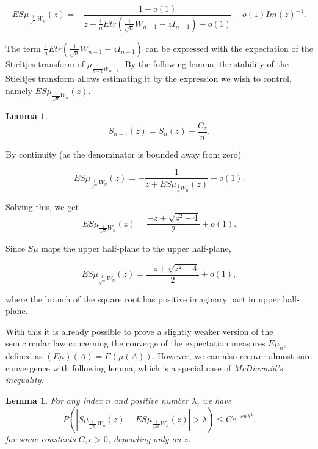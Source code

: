 \documentclass[12pt,a4paper,leqno]{report}
\theoremstyle{plain}
\newtheorem{lem}[equation]{Lemma}
\theoremstyle{definition}
\theoremstyle{remark}
\begin{document}
\begin{equation*}
ES\mu_{\frac{1}{\sqrt{n}}W_n}(z) = -\frac{1-o(1)}{z+\frac{1}{n}Etr(\frac{1}{\sqrt{n}}W_{n-1}-zI_{n-1}) + o(1)} + o(1)Im(z)^{-1}.
\end{equation*}

The term $\frac{1}{n}Etr(\frac{1}{\sqrt{n}}W_{n-1}-zI_{n-1})$ can be expressed with the expectation of the Stieltjes transform of $\mu_{\frac{1}{n-1}W_{n-1}}$. By the following lemma, the stability of the Stieltjes transform allows estimating it by 
the expression we wish to control, namely $ES\mu_{\frac{1}{\sqrt{n}}W_n}(z)$.

\begin{lem}
\begin{equation*}
S_{n-1}(z) = S_n(z) + \frac{C_z}{n}.
\end{equation*}
\end{lem}

By continuity (as the denominator is bounded away from zero) 

\begin{equation*}
ES\mu_{\frac{1}{\sqrt{n}}W_n}(z) = -\frac{1}{z+ES\mu_{\frac{1}{n}W_n}(z)} + o(1).
\end{equation*}

Solving this, we get
\begin{equation*}
ES\mu_{\frac{1}{\sqrt{n}}W_n}(z) = \frac{-z \pm \sqrt{z^2 - 4}}{2} +o(1).
\end{equation*}

Since $S\mu$ maps the upper half-plane to the upper half-plane,  

\begin{equation*}
ES\mu_{\frac{1}{\sqrt{n}}W_n}(z) = \frac{-z + \sqrt{z^2 - 4}}{2} +o(1),
\end{equation*}

where the branch of the square root has positive imaginary part in upper half-plane.

With this it is already possible to prove a slightly weaker version of the semicircular law concerning the converge of the expectation measures $E\mu_n$, defined as $(E\mu)(A) = E(\mu(A))$. However, we can also recover almost sure convergence with following lemma, which is a special case of \emph{McDiarmid's inequality}.

\begin{lem}
For any index $n$ and positive number $\lambda$, we have
\begin{equation*}
P(|S\mu_{\frac{1}{\sqrt{n}}W_n}(z)- ES\mu_{\frac{1}{\sqrt{n}}W_n}(z)|>\lambda) \leq Ce^{-cn\lambda^2}.
\end{equation*}
for some constants $C, c > 0$, depending only on $z$.
\end{lem}
\end{document}
